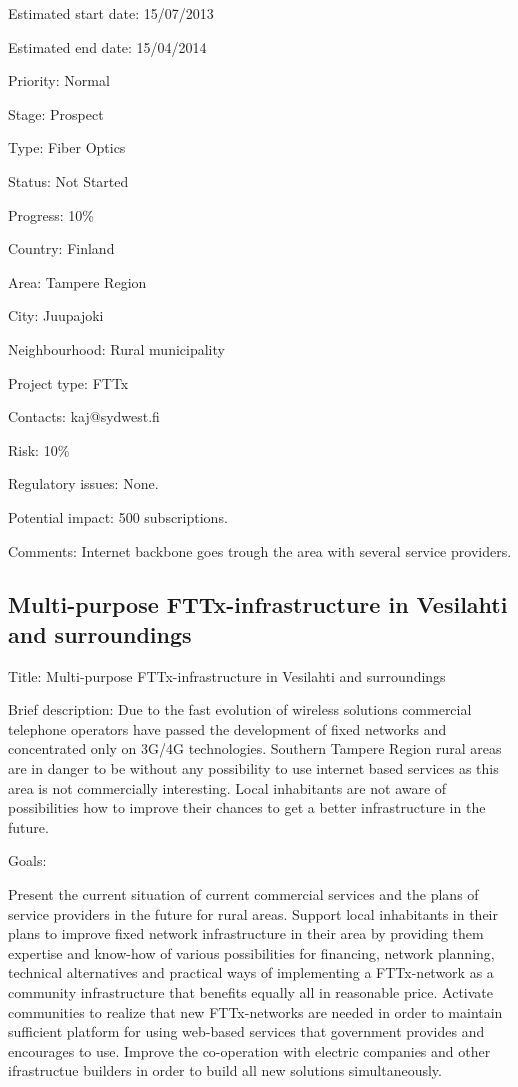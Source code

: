 \documentclass[draftclsnofoot,12pt,journal,onecolumn]{IEEEtran}
\begin{document}
Estimated start date: 15/07/2013 

Estimated end date: 15/04/2014 

Priority: Normal 

Stage: Prospect 

Type: Fiber Optics 

Status: Not Started 

Progress: 10\% 

Country: Finland 

Area: Tampere Region 

City: Juupajoki 

Neighbourhood: Rural municipality 

Project type: FTTx 

Contacts: kaj@sydwest.fi

Risk: 10\% 

Regulatory issues: None. 

Potential impact: 500 subscriptions. 

Comments: Internet backbone goes trough the area with several service 
providers. 

\subsection{Multi-purpose FTTx-infrastructure in Vesilahti and surroundings} 

Title: Multi-purpose FTTx-infrastructure in Vesilahti and surroundings 

Brief description: Due to the fast evolution of wireless solutions commercial 
telephone operators have passed the development of fixed networks and 
concentrated only on 3G/4G technologies. Southern Tampere Region rural areas 
are in danger to be without any possibility to use internet based services as 
this area is not commercially interesting. Local inhabitants are not aware of 
possibilities how to improve their chances to get a better infrastructure in 
the future. 

Goals: 

Present the current situation of current commercial services and the plans of 
service providers in the future for rural areas. Support local inhabitants in 
their plans to improve fixed network infrastructure in their area by 
providing them expertise and know-how of various possibilities for financing, 
network planning, technical alternatives and practical ways of implementing a 
FTTx-network as a community infrastructure that benefits equally all in 
reasonable price. Activate communities to realize that new FTTx-networks are 
needed in order to maintain sufficient platform for using web-based services 
that government provides and encourages to use. Improve the co-operation with 
electric companies and other ifrastructue builders in order to build all new 
solutions simultaneously. 
\end{document}
